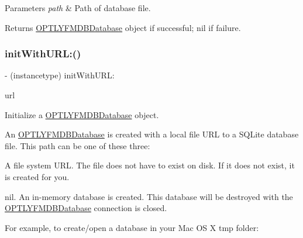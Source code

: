 \begin{DoxyParams}{Parameters}
{\em path} & Path of database file.\\
\hline
\end{DoxyParams}
\begin{DoxyReturn}{Returns}
{\ttfamily \mbox{\hyperlink{interface_o_p_t_l_y_f_m_d_b_database}{O\+P\+T\+L\+Y\+F\+M\+D\+B\+Database}}} object if successful; {\ttfamily nil} if failure. 
\end{DoxyReturn}
\mbox{\label{interface_o_p_t_l_y_f_m_d_b_database_a4fe721948e8ceefcdd65f0850b7c07b7}} 
\subsubsection{\texorpdfstring{init\+With\+U\+R\+L\+:()}{initWithURL:()}}
{\footnotesize\ttfamily -\/ (instancetype) init\+With\+U\+R\+L\+: \begin{DoxyParamCaption}\item[{(N\+S\+U\+RL $\ast$\+\_\+\+Nullable)}]{url }\end{DoxyParamCaption}}

Initialize a {\ttfamily \mbox{\hyperlink{interface_o_p_t_l_y_f_m_d_b_database}{O\+P\+T\+L\+Y\+F\+M\+D\+B\+Database}}} object.

An {\ttfamily \mbox{\hyperlink{interface_o_p_t_l_y_f_m_d_b_database}{O\+P\+T\+L\+Y\+F\+M\+D\+B\+Database}}} is created with a local file U\+RL to a S\+Q\+Lite database file. This path can be one of these three\+:


\begin{DoxyEnumerate}
\item A file system U\+RL. The file does not have to exist on disk. If it does not exist, it is created for you.
\item {\ttfamily nil}. An in-\/memory database is created. This database will be destroyed with the {\ttfamily \mbox{\hyperlink{interface_o_p_t_l_y_f_m_d_b_database}{O\+P\+T\+L\+Y\+F\+M\+D\+B\+Database}}} connection is closed.
\end{DoxyEnumerate}

For example, to create/open a database in your Mac OS X {\ttfamily tmp} folder\+:

